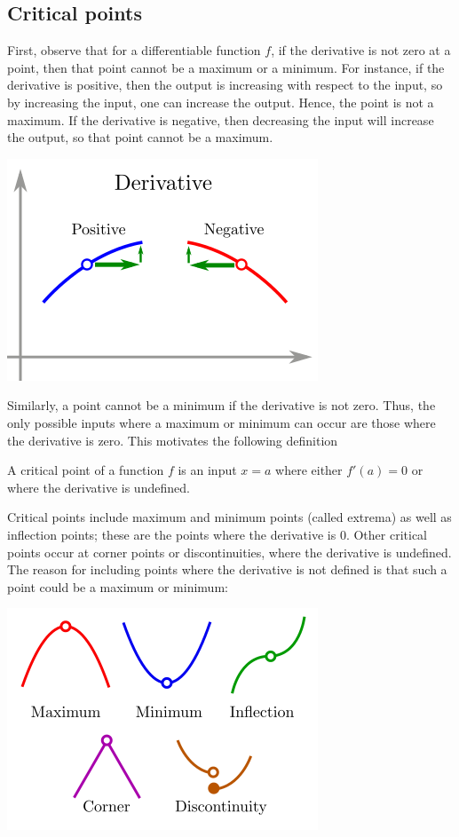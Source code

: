 \documentclass[twoside,openright,titlepage,a4paper]{book}
\begin{document}
\begin{sloppypar}
\subsection{Critical points}

First, observe that for a differentiable function $f$, if the derivative is not zero at a point, then that point cannot be a maximum or a minimum. For instance, if the derivative is positive, then the output is increasing with respect to the input, so by increasing the input, one can increase the output. Hence, the point is not a maximum. If the derivative is negative, then decreasing the input will increase the output, so that point cannot be a maximum.
\begin{center}\includegraphics[scale=0.6]{MaxMin}\end{center}

Similarly, a point cannot be a minimum if the derivative is not zero. Thus, the only possible inputs where a maximum or minimum can occur are those where the derivative is zero. This motivates the following definition
\begin{definitionbox}[title=\textbf{Critical point}]
A critical point of a function $f$ is an input $x=a$ where either $f'(a)=0$ or where the derivative is undefined.
\end{definitionbox}

Critical points include maximum and minimum points (called extrema) as well as inflection points; these are the points where the derivative is 0. Other critical points occur at corner points or discontinuities, where the derivative is undefined. The reason for including points where the derivative is not defined is that such a point could be a maximum or minimum:
\begin{center}\includegraphics[scale=0.6]{CriticalPoints}\end{center}


\end{sloppypar}
\end{document}
